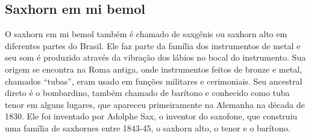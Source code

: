 \subsection*{Saxhorn em mi bemol}

O saxhorn em mi bemol também é chamado de saxgênis
ou saxhorn alto em diferentes partes do Brasil. Ele faz parte da
família dos instrumentos de metal e seu som é produzido através da
vibração dos lábios no bocal do instrumento. Sua origem se encontra na
Roma antiga, onde instrumentos feitos de bronze e metal,
chamados “tubas”, eram usado em funções militares e cerimoniais. Seu
ancestral direto é o bombardino, também chamado de barítono e
conhecido como tuba tenor em alguns lugares, que apareceu
primeiramente na Alemanha na década de 1830. Ele foi inventado por
Adolphe Sax, o inventor do saxofone, que construiu uma família de
saxhornes entre 1843-45, o saxhorn alto, o tenor e o barítono.